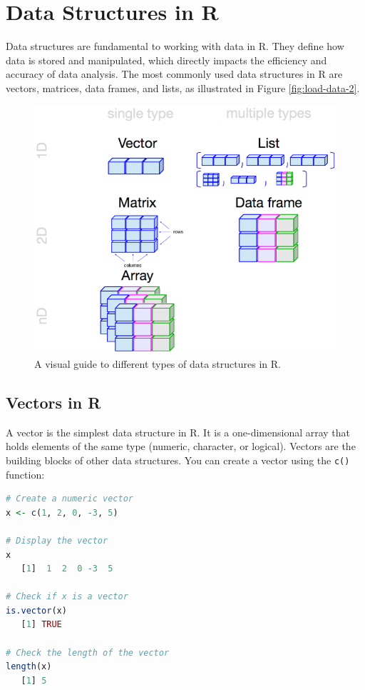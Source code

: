 \documentclass[
]{book}
\newcommand{\passthrough}[1]{#1}
\theoremstyle{definition}
\theoremstyle{definition}
\theoremstyle{definition}
\theoremstyle{definition}
\theoremstyle{remark}
\begin{document}
\section{Data Structures in R}\label{data-structures-in-r}

Data structures are fundamental to working with data in R. They define how data is stored and manipulated, which directly impacts the efficiency and accuracy of data analysis. The most commonly used data structures in R are vectors, matrices, data frames, and lists, as illustrated in Figure \ref{fig:load-data-2}.

\begin{figure}

{\centering \includegraphics[width=0.6\linewidth]{images/R-objects} 

}

\caption{A visual guide to different types of data structures in R.}\label{fig:R-objects}
\end{figure}

\subsection*{Vectors in R}\label{vectors-in-r}

A vector is the simplest data structure in R. It is a one-dimensional array that holds elements of the same type (numeric, character, or logical). Vectors are the building blocks of other data structures. You can create a vector using the \passthrough{\lstinline!c()!} function:

\begin{lstlisting}[language=R]
# Create a numeric vector
x <- c(1, 2, 0, -3, 5)

# Display the vector
x
   [1]  1  2  0 -3  5

# Check if x is a vector
is.vector(x)
   [1] TRUE

# Check the length of the vector
length(x)
   [1] 5
\end{lstlisting}
\end{document}
